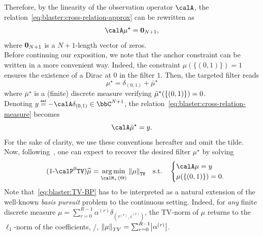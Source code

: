 \mynewline
Therefore, by the linearity of the observation operator $\opObs$, the relation~\cref{eq:blaster:cross-relation-approx} can be rewritten as
\begin{equation}
    \label{eq:blaster:cross-relation-measure}
    \opObs\mu^\star = \zeroVect_{N+1}
    ,
\end{equation}
where $\mathbf{0}_{N+1}$ is a $N+1$-length vector of zeros.
\\Before continuing our exposition, we note that the anchor constraint can be written in a more convenient way.
Indeed, the constraint $\mu(\{(0, 1)\})=1$ ensures the existence of a Dirac at $0$ in the filter $1$.
Then, the targeted filter reads
\begin{equation}
    \mu^\star = \delta_{(0, 1)} + \bar{\mu}^\star
\end{equation}
where $\bar{\mu}^\star$ is a (finite) discrete measure verifying  $\bar{\mu}^\star\kparen{\{(0, 1)\}} = 0$.
\\Denoting $y\eqdef-\opObs\delta_{(0, 1)}\in\bbC^{N+1}$, the relation~\cref{eq:blaster:cross-relation-measure} becomes
\begin{equation}
    \label{eq:blaster:cross-relation-measure-and-obs}
    \opObs\bar{\mu}^\star = y
    .
\end{equation}
For the sake of clarity, we use these conventions hereafter and omit the tilde.
Now, following~, one can expect to recover the desired filter $\mu^\star$ by solving
\begin{equation}
    \stepcounter{equation}
    \tag{\theequation-$\calP^0{\text{\texttt{TV}}}$}
    \label{eq:blaster:TV-BP}
    \widehat{\mu}
    =
    \kargmin_{\posDisRadonMeasure}
    \;
    \normTV{
        \mu
    }
    \quad
    \text{s.t.}
    \quad
    \begin{cases}
        \opObs\mu
        = y \\
        \mu(\{(0, 1)\}) = 0.
    \end{cases}
\end{equation}
Note that~\eqref{eq:blaster:TV-BP} has to be interpreted as a natural extension of the well-known \emph{basis pursuit} problem to the continuous setting.
Indeed, for \emph{any} finite discrete measure $\mu = \sum_{r=0}^{R-1} \alpha^{(r)}\delta_{(\tau^{(r)}, i^{(r)})}$, the TV-norm of $\mu$ returns to the $\ell_1$-norm of the coefficients, \ie/, $\kvvbar{\mu}_{TV} = \sum_{\idxEch=0}^{\numEchs-1} \kvbar{\alpha^{(r)}}$.

